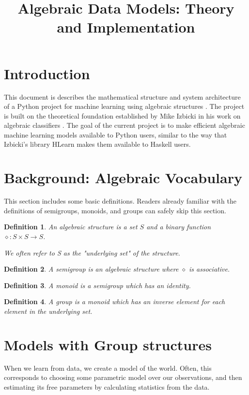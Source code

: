 \documentclass{article}
\begin{document}
\theoremstyle{mydef}
\newtheorem{mydef}{Definition}[section]
\title{Algebraic Data Models: Theory and Implementation}
\maketitle
\section{Introduction}
This document is describes the mathematical structure and system architecture of a Python project for machine learning using algebraic structures \cite{algebraic}. The project is built on the theoretical foundation established by Mike Izbicki in his work on algebraic classifiers \cite{algebraic classifiers}. The goal of the current project is to make efficient algebraic machine learning models available to Python users, similar to the way that Izbicki's library HLearn \cite{hlearn} makes them available to Haskell users.

\section{Background: Algebraic Vocabulary}
This section includes some basic definitions. Readers already familiar with the definitions of semigroups, monoids, and groups can safely skip this section.
\begin{mydef}
An algebraic structure is a set $S$ and a binary function $\diamond: S \times S \rightarrow S$.

We often refer to S as the "underlying set" of the structure.
\end{mydef}
\begin{mydef}
A semigroup is an algebraic structure where $\diamond$ is associative.
\end{mydef}
\begin{mydef}
A monoid is a semigroup which has an identity.
\end{mydef}
\begin{mydef}
A group is a monoid which has an inverse element for each element in the underlying set.
\end{mydef}
\section{Models with Group structures}

When we learn from data, we create a model of the world. Often, this corresponds to choosing some parametric model over our observations, and then estimating its free parameters by calculating statistics from the data. 
\end{document}
